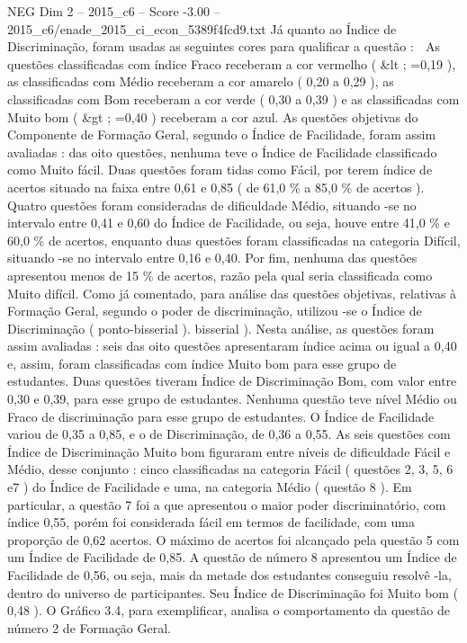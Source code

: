\begin{textsample}{NEG Dim 2 – 2015\_c6 – Score -3.00 – 2015\_c6/enade\_2015\_ci\_econ\_5389f4fcd9.txt}
Já quanto ao Índice de Discriminação, foram usadas as seguintes cores para qualificar a questão :  As questões classificadas com índice Fraco receberam a cor vermelho ( \&lt ; =0,19 ), as classificadas com Médio receberam a cor amarelo ( 0,20 a 0,29 ), as classificadas com Bom receberam a cor verde ( 0,30 a 0,39 ) e as classificadas com Muito bom ( \&gt ; =0,40 ) receberam a cor azul.
As questões objetivas do Componente de Formação Geral, segundo o Índice de Facilidade, foram assim avaliadas : das oito questões, nenhuma teve o Índice de Facilidade classificado como Muito fácil.
Duas questões foram tidas como Fácil, por terem índice de acertos situado na faixa entre 0,61 e 0,85 ( de 61,0 \% a 85,0 \% de acertos ).
Quatro questões foram consideradas de dificuldade Médio, situando -se no intervalo entre 0,41 e 0,60 do Índice de Facilidade, ou seja, houve entre 41,0 \% e 60,0 \% de acertos, enquanto duas questões foram classificadas na categoria Difícil, situando -se no intervalo entre 0,16 e 0,40.
Por fim, nenhuma das questões apresentou menos de 15 \% de acertos, razão pela qual seria classificada como Muito difícil.
Como já comentado, para análise das questões objetivas, relativas à Formação Geral, segundo o poder de discriminação, utilizou -se o Índice de Discriminação ( ponto-bisserial ). bisserial ).
Nesta análise, as questões foram assim avaliadas : seis das oito questões apresentaram índice acima ou igual a 0,40 e, assim, foram classificadas com índice Muito bom para esse grupo de estudantes.
Duas questões tiveram Índice de Discriminação Bom, com valor entre 0,30 e 0,39, para esse grupo de estudantes.
Nenhuma questão teve nível Médio ou Fraco de discriminação para esse grupo de estudantes.
O Índice de Facilidade variou de 0,35 a 0,85, e o de Discriminação, de 0,36 a 0,55.
As seis questões com Índice de Discriminação Muito bom figuraram entre níveis de dificuldade Fácil e Médio, desse conjunto : cinco classificadas na categoria Fácil ( questões 2, 3, 5, 6 e7 ) do Índice de Facilidade e uma, na categoria Médio ( questão 8 ).
Em particular, a questão 7 foi a que apresentou o maior poder discriminatório, com índice 0,55, porém foi considerada fácil em termos de facilidade, com uma proporção de 0,62 acertos.
O máximo de acertos foi alcançado pela questão 5 com um Índice de Facilidade de 0,85.
A questão de número 8 apresentou um Índice de Facilidade de 0,56, ou seja, mais da metade dos estudantes conseguiu resolvê -la, dentro do universo de participantes.
Seu Índice de Discriminação foi Muito bom ( 0,48 ).
O Gráfico 3.4, para exemplificar, analisa o comportamento da questão de número 2 de Formação Geral.

\end{textsample}
